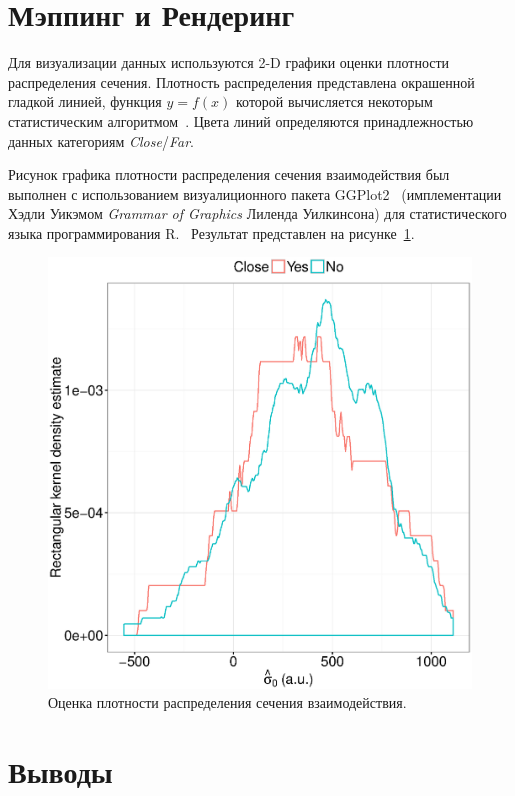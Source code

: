 \documentclass{article}
\begin{document}
	\section{Мэппинг и Рендеринг}
	Для визуализации данных используются 2-D графики оценки плотности распределения сечения. Плотность распределения представлена окрашенной гладкой линией, функция $y = f(x)$ которой вычисляется некоторым статистическим алгоритмом~\cite{Density_estimation}. Цвета линий определяются принадлежностью данных категориям \emph{Close}/\emph{Far}.
	
	Рисунок графика плотности распределения сечения взаимодействия был выполнен с использованием визуалиционного пакета GGPlot2~\cite{GGPlot2} (имплементации Хэдли  Уикэмом \emph{Grammar of Graphics} Лиленда Уилкинсона) для статистического языка программирования R.~\cite{GGPLOT2_WIKI} Результат представлен на рисунке~\ref{fig:CS0au_dens}.
	
	\begin{figure}[h!]
		\centering
		\includegraphics[scale=.7]{CS0_au_dens.eps}
		\caption{Оценка плотности распределения сечения взаимодействия.\label{fig:CS0au_dens}}
	\end{figure}

	\section{Выводы}
	
\end{document}
